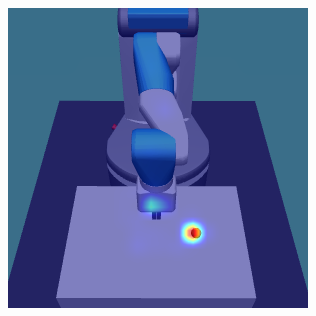 \begin{figure}[h!]
\begin{subfigure}{0.24\columnwidth}
  \end{subfigure}
  \begin{subfigure}{0.24\columnwidth}
    \includegraphics[width=\linewidth]{figures/chapter6/distractor_saliency_fetch_pro_on/standard_sensor_std}
  \end{subfigure}
  

\end{figure}
